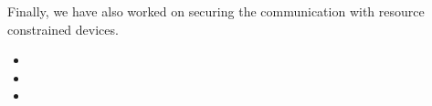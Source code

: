 \begin{sloppypar}
Finally, we have also worked on securing the communication with resource constrained devices.
\begin{itemize}
 \item[]  %
 \item[]  %
 \item[]  %
\end{itemize}

\end{sloppypar}